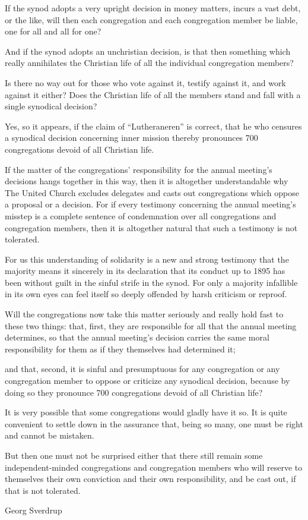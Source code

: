 If the synod adopts a very upright decision in money matters, incurs a vast debt, or the like, will then each congregation and each congregation member be liable, one for all and all for one?

And if the synod adopts an unchristian decision, is that then something which really annihilates the Christian life of all the individual congregation members?

Is there no way out for those who vote against it, testify against it, and work against it either?
Does the Christian life of all the members stand and fall with a single synodical decision?

Yes, so it appears, if the claim of “Lutheraneren” is correct, that he who censures a synodical decision concerning inner mission thereby pronounces 700 congregations devoid of all Christian life.

If the matter of the congregations’ responsibility for the annual meeting’s decisions hangs together in this way, then it is altogether understandable why The United Church excludes delegates and casts out congregations which oppose a proposal or a decision. For if every testimony concerning the annual meeting’s misstep is a complete sentence of condemnation over all congregations and congregation members, then it is altogether natural that such a testimony is not tolerated.

For us this understanding of solidarity is a new and strong testimony that the majority means it sincerely in its declaration that its conduct up to 1895 has been without guilt in the sinful strife in the synod. For only a majority infallible in its own eyes can feel itself so deeply offended by harsh criticism or reproof.

Will the congregations now take this matter seriously and really hold fast to these two things: that, first, they are responsible for all that the annual meeting determines, so that the annual meeting’s decision carries the same moral responsibility for them as if they themselves had determined it;

and that, second, it is sinful and presumptuous for any congregation or any congregation member to oppose or criticize any synodical decision, because by doing so they pronounce 700 congregations devoid of all Christian life?

It is very possible that some congregations would gladly have it so. It is quite convenient to settle down in the assurance that, being so many, one must be right and cannot be mistaken.

But then one must not be surprised either that there still remain some independent-minded congregations and congregation members who will reserve to themselves their own conviction and their own responsibility, and be cast out, if that is not tolerated.

Georg Sverdrup
